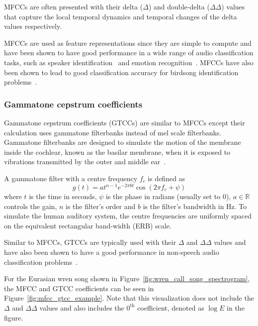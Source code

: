 MFCCs are often presented with their delta ($\Delta$) and double-delta
($\Delta\Delta$) values that capture the local temporal dynamics and temporal
changes of the delta values respectively.

MFCCs are used as feature representations since they are simple to compute and
have been shown to have good performance in a wide range of audio classification
tasks, such as speaker identification~\cite{muda2010voice} and emotion
recognition~\cite{likitha2017speech}. MFCCs have also been shown to lead to good
classification accuracy for birdsong identification
problems~\cite{fagerlund2007bird,ramashini2022robust}.

\subsubsection{Gammatone cepstrum coefficients}

Gammatone cepstrum coefficients (GTCCs) are similar to MFCCs except their
calculation  uses gammatone filterbanks instead of mel scale filterbanks.
Gammatone filterbanks are designed to simulate the motion of the membrane inside
the cochlear, known as the basilar membrane, when it is exposed to vibrations
transmitted by the outer and middle ear~\cite{patterson1992complex}.

A gammatone filter with a centre frequency $f_c$ is defined as
\begin{equation}
  g(t) = at^{n-1}e^{-2\pi b t} \cos(2\pi f_c + \psi)
\end{equation}
where $t$ is the time in seconds, $\psi$ is the phase in radians (usually set to
0), $a \in \mathbb{R}$ controls the gain, $n$ is the filter's order and $b$ is
the filter's bandwidth in Hz. To simulate the human auditory system, the centre
frequencies are uniformly spaced on the equivalent rectangular band-width (ERB)
scale.

Similar to MFCCs, GTCCs are typically used with their $\Delta$ and $\Delta\Delta$
values and have also been shown to have a good performance in
non-speech audio classification problems~\cite{valero2012gammatone}.

For the Eurasian wren song shown in Figure~\ref{fig:wren_call_song_spectrogram},
the MFCC and GTCC coefficients can be seen in
Figure~\ref{fig:mfcc_gtcc_example}. Note that this visualization does not
include the $\Delta$ and $\Delta\Delta$ values and also includes the
$0^{\text{th}}$ coefficient, denoted as $\log E$ in the figure.

